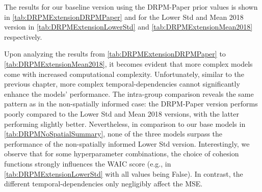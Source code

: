\documentclass[12pt,a4paper]{article}
\begin{document}
The results for our baseline version using the DRPM-Paper prior values is shown in \cref{tab:DRPMExtensionDRPMPaper} and
for the Lower Std and Mean 2018 version in \cref{tab:DRPMExtensionLowerStd} and \cref{tab:DRPMExtensionMean2018} respectively.

Upon analyzing the results from \cref{tab:DRPMExtensionDRPMPaper} to \cref{tab:DRPMExtensionMean2018}, it becomes evident that more 
complex models come with increased computational complexity. 
Unfortunately, similar to the previous chapter, more complex temporal-dependencies cannot significantly enhance the models' 
performance. The intra-group comparison reveals the same pattern as in the non-spatially informed case: 
the DRPM-Paper version performs poorly compared to the Lower Std and Mean 2018 versions, with the latter performing slightly better. 
Nevertheless, in comparison to our base models in \cref{tab:DRPMNoSpatialSummary}, none of the three models surpass the performance 
of the non-spatially informed Lower Std version. Interestingly, we observe that for some hyperparameter combinations, the choice of 
cohesion functions strongly influences the WAIC score (e.g., in \cref{tab:DRPMExtensionLowerStd} with all values being False). In 
contrast, the different temporal-dependencies only negligibly affect the MSE.
\end{document}
